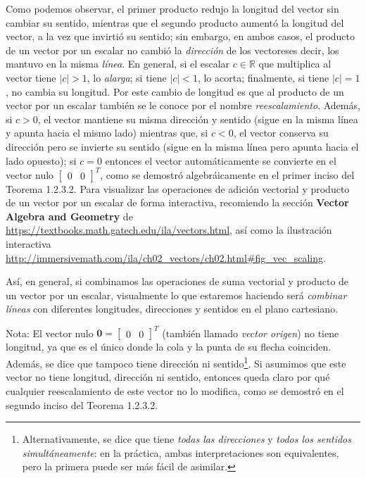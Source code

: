 \documentclass[12pt]{article}
\begin{document}
    Como podemos observar, el primer producto redujo la longitud del vector sin cambiar su sentido, mientras que el segundo producto aumentó la longitud del vector, a la vez que invirtió su sentido; sin embargo, en ambos casos, el producto de un vector por un escalar no cambió la \emph{dirección} de los vectores\textemdash es decir, los mantuvo en la misma \emph{línea}. En general, si el escalar $c\in\mathbb{R}$ que multiplica al vector tiene $|c|>1$, lo \emph{alarga}; si tiene $|c|<1$, lo acorta; finalmente, si tiene $|c|=1$, no cambia su longitud. Por este cambio de longitud es que al producto de un vector por un escalar también se le conoce por el nombre \emph{reescalamiento}. Además, si $c>0$, el vector mantiene su misma dirección y sentido (sigue en la misma línea y apunta hacia el mismo lado) mientras que, si $c<0$, el vector conserva su dirección pero se invierte su sentido (sigue en la misma línea pero apunta hacia el lado opuesto); si $c=0$ entonces el vector automáticamente se convierte en el vector nulo $\begin{bmatrix}0&0\end{bmatrix}^T$, como se demostró algebráicamente en el primer inciso del Teorema 1.2.3.2. Para visualizar las operaciones de adición vectorial y producto de un vector por un escalar de forma interactiva, recomiendo la sección \textbf{Vector Algebra and Geometry} de \url{https://textbooks.math.gatech.edu/ila/vectors.html}, así como la ilustración interactiva \url{http://immersivemath.com/ila/ch02_vectors/ch02.html#fig_vec_scaling}.

    Así, en general, si combinamos las operaciones de suma vectorial y producto de un vector por un escalar, visualmente lo que estaremos haciendo será \emph{combinar líneas} con diferentes longitudes, direcciones y sentidos en el plano cartesiano. 

\vspace{3mm}

Nota: El vector nulo $\mathbf{0}=\begin{bmatrix}0&0\end{bmatrix}^T$ (también llamado \emph{vector origen}) no tiene longitud, ya que es el único donde la cola y la punta de su flecha coinciden. Además, se dice que tampoco tiene dirección ni sentido\footnote{Alternativamente, se dice que tiene \emph{todas las direcciones} y \emph{todos los sentidos simultáneamente}: en la práctica, ambas interpretaciones son equivalentes, pero la primera puede ser más fácil de asimilar.}. Si asumimos que este vector no tiene longitud, dirección ni sentido, entonces queda claro por qué cualquier reescalamiento de este vector no lo modifica, como se demostró en el segundo inciso del Teorema 1.2.3.2.
\end{document}

